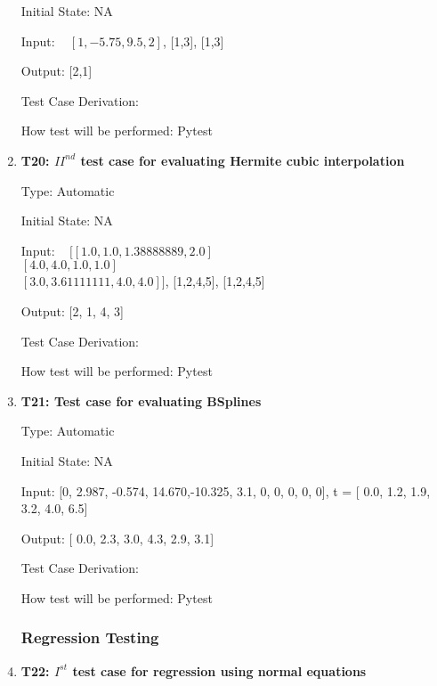 \documentclass[12pt, titlepage]{article}
\begin{document}
\begin{enumerate}
Initial State: NA 

Input: ~\newline 
$[1,-5.75, 9.5, 2]$, [1,3], [1,3]						

Output: [2,1]

Test Case Derivation: \cite{HermiteCubic2}

How test will be performed: Pytest

\item{\textbf{T20: ${II}^{nd}$ test case for evaluating Hermite cubic 
interpolation}}

Type: Automatic

Initial State: NA 

Input: ~\newline 
$[[1.0,1.0, 1.38888889, 2.0]$\\
$[4.0, 4.0, 1.0, 1.0]$\\
$[3.0, 3.61111111, 4.0, 4.0]]$, [1,2,4,5], [1,2,4,5]					

Output: [2, 1, 4, 3]

Test Case Derivation: \cite{HermiteCubic2}

How test will be performed: Pytest

\item{\textbf{T21: Test case for evaluating BSplines}}

Type: Automatic

Initial State: NA 

Input: [0, 2.987, -0.574, 14.670,-10.325, 3.1, 0, 0, 0, 0, 0], t = [ 0.0, 1.2,  
1.9, 3.2,  4.0,  6.5] 

Output: [ 0.0,  2.3,  3.0,  4.3,  2.9,  3.1]

Test Case Derivation: \cite{BSpline}

How test will be performed: Pytest







\subsubsection{Regression Testing}\label{ResgressionTesting}



\item{\textbf{T22: $I^{st}$ test case for regression using normal equations} \\}


\end{enumerate}
\end{document}
